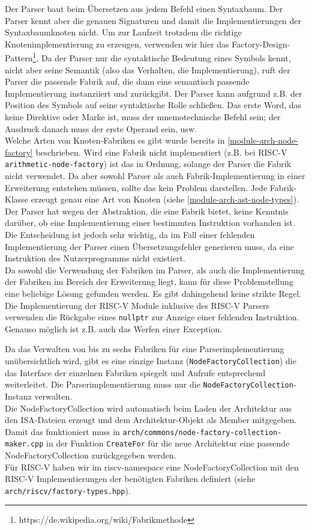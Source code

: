 Der Parser baut beim Übersetzen aus jedem Befehl einen Syntaxbaum. Der Parser kennt aber die genauen Signaturen und damit die Implementierungen der Syntaxbaumknoten nicht. Um zur Laufzeit trotzdem die richtige Knotenimplementierung zu erzeugen, verwenden wir hier das Factory-Design-Pattern\footnote{https://de.wikipedia.org/wiki/Fabrikmethode}. Da der Parser nur die syntaktische Bedeutung eines Symbols kennt, nicht aber seine Semantik (also das Verhalten, die Implementierung), ruft der Parser die passende Fabrik auf, die dann eine semantisch passende Implementierung instanziiert und zurückgibt. Der Parser kann aufgrund z.B. der Position des Symbols auf seine syntaktische Rolle schließen. Das erste Word, das keine Direktive oder Marke ist, muss der mnemotechnische Befehl sein; der Ausdruck danach muss der erste Operand sein, usw. \\
Welche Arten von Knoten-Fabriken es gibt wurde bereits in \autoref{module-arch-node-factory} beschrieben. Wird eine Fabrik nicht implementiert (z.B. bei RISC-V \texttt{arithmetic-node-factory}) ist das in Ordnung, solange der Parser die Fabrik nicht verwendet. Da aber sowohl Parser als auch Fabrik-Implementierung in einer Erweiterung entstehen müssen, sollte das kein Problem darstellen. Jede Fabrik-Klasse erzeugt genau eine Art von Knoten (siehe \autoref{module-arch-ast-node-types}).\\

Der Parser hat wegen der Abstraktion, die eine Fabrik bietet, keine Kenntnis darüber, ob eine Implementierung einer bestimmten Instruktion vorhanden ist. Die Entscheidung ist jedoch sehr wichtig, da im Fall einer fehlenden Implementierung der Parser einen Übersetzungsfehler generieren muss, da eine Instruktion des Nutzerprogramms nicht existiert.\\
Da sowohl die Verwendung der Fabriken im Parser, als auch die Implementierung der Fabriken im Bereich der Erweiterung liegt, kann für diese Problemstellung eine beliebige Lösung gefunden werden. Es gibt dahingehend keine strikte Regel.\\
Die Implementierung der RISC-V Module inklusive des RISC-V Parsers verwenden die Rückgabe eines \texttt{nullptr} zur Anzeige einer fehlenden Instruktion. Genauso möglich ist z.B. auch das Werfen einer Exception.

Da das Verwalten von bis zu sechs Fabriken für eine Parserimplementierung unübersichtlich wird, gibt es eine einzige Instanz (\texttt{NodeFactoryCollection}) die das Interface der einzelnen Fabriken spiegelt und Aufrufe entsprechend weiterleitet. Die Parserimplementierung muss nur die \texttt{NodeFactoryCollection}-Instanz verwalten.\\
Die NodeFactoryCollection wird automatisch beim Laden der Architektur aus den ISA-Dateien erzeugt und dem Architektur-Objekt als Member mitgegeben. Damit das funktioniert muss in \texttt{arch/commons/node-factory-collection-maker.cpp} in der Funktion \texttt{CreateFor} für die neue Architektur eine passende NodeFactoryCollection zurückgegeben werden.\\
Für RISC-V haben wir im riscv-namespace eine NodeFactoryCollection mit den RISC-V Implementierungen der benötigten Fabriken definiert (siehe \texttt{arch/riscv/factory-types.hpp}).


